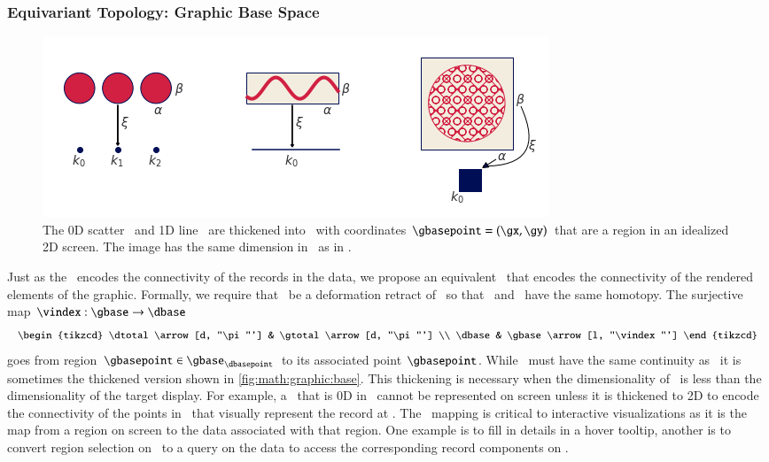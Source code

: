 \documentclass[journal]{vgtc}                %
\begin{document}
\subsubsection{Equivariant Topology: Graphic Base Space}
\label{sec:math:graphic:base}
\begin{figure}[htb]
  \centering %
  \includegraphics[width=\columnwidth]{retraction_maps.png}
  \caption{The 0D scatter \dbasepoint\ and 1D line \dbasepoint\ are thickened into \gbase\ with coordinates $\gbasepoint=(\gx, \gy)$ that are a region in an idealized 2D screen. The image has the same dimension in \gbase\ as in \dbase.}
  \label{fig:math:graphic:base}
 \end{figure}

Just as the \dbase\ encodes the connectivity of the records in the data, we propose an equivalent \gbase\ that encodes the connectivity of the rendered elements of the graphic. Formally, we require that \dbase\ be a deformation retract\cite{RetractionTopology2020} of \gbase\ so that \dbase\ and \gbase\ have the same homotopy. The surjective map $\vindex: \gbase \rightarrow \dbase$ 
\begin{equation}
    \begin{tikzcd}
        \dtotal \arrow[d, "\pi"'] & \gtotal \arrow[d, "\pi"'] \\
        \dbase                   & \gbase \arrow[l, "\vindex"']
    \end{tikzcd}
\end{equation}
goes from region $\gbasepoint \in \gbase_{\dbasepoint}$ to its associated point $\gbasepoint$. While \gbase\ must have the same continuity as \dbase\, it is sometimes the  thickened version shown in \autoref{fig:math:graphic:base}. This thickening is necessary when the dimensionality of \dbase\ is less than the dimensionality of the target display. For example, a \dbasepoint\ that is 0D in \dbase\ cannot be represented on screen unless it is thickened to 2D to encode the connectivity of the points in \gfiber\ that visually represent the record at \dbasepoint. The \vindex\ mapping is critical to interactive visualizations as it is the map from a region on screen to the data associated with that region. One example is to fill in details in a hover tooltip, another is to convert region selection on \gbase\ to a query on the data to access the corresponding record components on \dbase.
\end{document}
